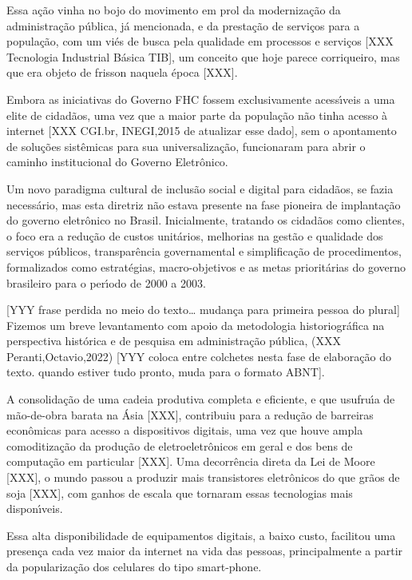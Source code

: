 \documentclass[
12pt,		%
openright,	%
twoside,  %
a4paper,			%
chapter=TITLE,		%
english,			%
french,				%
spanish,			%
brazil				%
]{USPSC-classe/USPSC}
\begin{document}
Essa a\c{c}\~ao vinha no bojo do movimento em prol da moderniza\c{c}\~ao da administra\c{c}\~ao p\'ublica, j\'a mencionada, e da presta\c{c}\~ao de servi\c{c}os para a popula\c{c}\~ao, com um vi\'es de busca pela \textquotedbl qualidade em processos e servi\c{c}os [XXX Tecnologia Industrial B\'asica TIB], um conceito que hoje parece corriqueiro, mas que era objeto de frisson naquela \'epoca [XXX].


Embora as iniciativas do Governo FHC fossem exclusivamente acess\'{\i}veis a uma elite de cidad\~aos, uma vez que a maior parte da popula\c{c}\~ao n\~ao tinha acesso \`a internet [XXX CGI.br, INEGI,2015 de atualizar esse dado], sem o apontamento de solu\c{c}\~oes sist\^emicas para sua universaliza\c{c}\~ao, funcionaram para abrir o caminho institucional do Governo Eletr\^onico.


Um novo paradigma cultural de inclus\~ao social e digital para cidad\~aos, se fazia necess\'ario, mas esta diretriz n\~ao estava presente na fase pioneira de implanta\c{c}\~ao do governo eletr\^onico no Brasil. Inicialmente, tratando os cidad\~aos como clientes, o foco era a redu\c{c}\~ao de custos unit\'arios, melhorias na gest\~ao e qualidade dos servi\c{c}os p\'ublicos, transpar\^encia governamental e simplifica\c{c}\~ao de procedimentos, formalizados como estrat\'egias, macro-objetivos e  as metas priorit\'arias  do governo brasileiro para o per\'{\i}odo de 2000 a 2003.


[YYY frase perdida no meio do texto… mudan\c{c}a para primeira pessoa do plural] Fizemos um breve levantamento com apoio da metodologia historiogr\'afica na  perspectiva hist\'orica e de pesquisa em administra\c{c}\~ao p\'ublica, (XXX Peranti,Octavio,2022) [YYY coloca entre colchetes nesta fase de elabora\c{c}\~ao do texto. quando estiver tudo pronto, muda para o formato ABNT].


A consolida\c{c}\~ao de uma cadeia produtiva completa e eficiente, e que usufru\'{\i}a de m\~ao-de-obra barata na \'Asia [XXX], contribuiu para a redu\c{c}\~ao de barreiras econ\^omicas para acesso a dispositivos digitais, uma vez que houve ampla comoditiza\c{c}\~ao da produ\c{c}\~ao de eletroeletr\^onicos em geral e dos bens de computa\c{c}\~ao em particular [XXX]. Uma decorr\^encia direta da Lei de Moore [XXX], o mundo passou a produzir mais transistores eletr\^onicos do que gr\~aos de soja [XXX], com ganhos de escala que tornaram essas tecnologias mais dispon\'{\i}veis.


Essa alta disponibilidade de equipamentos digitais, a baixo custo, facilitou uma presen\c{c}a cada vez maior da internet na vida das pessoas, principalmente a partir da populariza\c{c}\~ao dos celulares do tipo \textquotedbl smart-phone.
\end{document}
